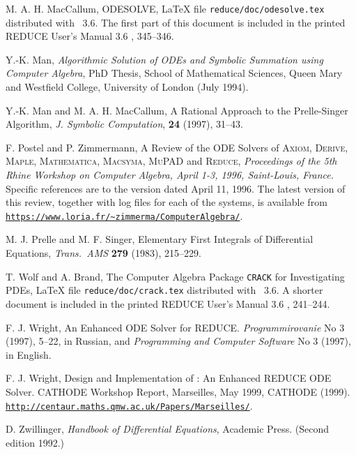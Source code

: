 \begin{thebibliography}{999}
 M. A. H. MacCallum, ODESOLVE, \LaTeX{} file
\texttt{reduce/doc/odesolve.tex} distributed with \REDUCE~3.6.  The
first part of this document is included in the printed REDUCE User's
Manual 3.6 \cite{Hearn-manual}, 345--346.

 Y.-K. Man, \textit{Algorithmic Solution of ODEs and
Symbolic Summation using Computer Algebra}, PhD Thesis, School of
Mathematical Sciences, Queen Mary and Westfield College, University of
London (July 1994).

 Y.-K. Man and M. A. H. MacCallum, A Rational
Approach to the Prelle-Singer Algorithm, \textit{J. Symbolic
Computation}, \textbf{24} (1997), 31--43.

 F. Postel and P. Zimmermann, A Review of the ODE
Solvers of \textsc{Axiom}, \textsc{Derive}, \textsc{Maple},
\textsc{Mathematica}, \textsc{Macsyma}, \textsc{MuPAD} and
\textsc{Reduce}, \textit{Proceedings of the 5th Rhine Workshop on
Computer Algebra, April 1-3, 1996, Saint-Louis, France.}
Specific references are to the version dated April 11, 1996.
The latest version of this review, together with log files for each of
the systems, is available from
\href{https://www.loria.fr/~zimmerma/ComputerAlgebra/}%
{\texttt{https://www.loria.fr/\textasciitilde zimmerma/ComputerAlgebra/}}.

 M. J. Prelle and M. F. Singer, Elementary
First Integrals of Differential Equations, \textit{Trans.\ AMS}
\textbf{279} (1983), 215--229.

 T. Wolf and A. Brand, The Computer Algebra Package
\texttt{CRACK} for Investigating PDEs, \LaTeX{} file
\texttt{reduce/doc/crack.tex} distributed with \REDUCE~3.6.  A shorter
document is included in the printed REDUCE User's Manual 3.6
\cite{Hearn-manual}, 241--244.

 F. J. Wright, An Enhanced ODE Solver for REDUCE.
\textit{Programmirovanie} No 3 (1997), 5--22, in Russian, and
\textit{Programming and Computer Software} No 3 (1997), in English.

 F. J. Wright, Design and Implementation of
 : An Enhanced REDUCE ODE Solver.  CATHODE Workshop
Report, Marseilles, May 1999, CATHODE (1999). \\
\href{http://centaur.maths.qmw.ac.uk/Papers/Marseilles/}%
{\texttt{http://centaur.maths.qmw.ac.uk/Papers/Marseilles/}}.

 D. Zwillinger, \textit{Handbook of Differential
Equations}, Academic Press.  (Second edition 1992.)


\end{thebibliography}
